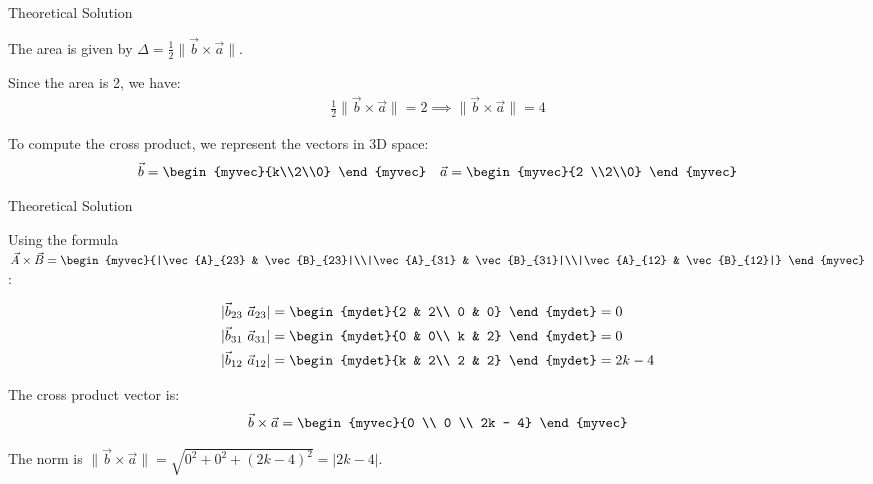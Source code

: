 \documentclass{beamer}
\numberwithin{equation}{section}
\theoremstyle{remark}
\providecommand{\norm}[1]{\lVert#1\rVert}
\begin{document}
	\begin{frame}{Theoretical Solution}
		
		The area is given by $\Delta = \frac{1}{2}\norm{\vec{b}\times\vec{a}}$.
		
		Since the area is 2, we have:
		\begin{align}
			\frac{1}{2}\norm{\vec{b}\times\vec{a}} = 2 \implies \norm{\vec{b}\times\vec{a}} = 4
		\end{align}
		
		To compute the cross product, we represent the vectors in 3D space:
		\begin{align}
			\vec{b} = \begin{myvec}{k\\2\\0} \end{myvec} && \vec{a} = \begin{myvec}{2 \\2\\0} \end{myvec}
		\end{align}
		
	\end{frame}
	
	\begin{frame}{Theoretical Solution}
		
		Using the formula $\vec{A}\times\vec{B} = \begin{myvec}{|\vec{A}_{23} & \vec{B}_{23}|\\|\vec{A}_{31} & \vec{B}_{31}|\\|\vec{A}_{12} & \vec{B}_{12}|} \end{myvec}$:
		
		\begin{align}
			|\vec{b}_{23} \text{ } \vec{a}_{23}| &= \begin{mydet}{2 & 2\\ 0 & 0} \end{mydet} = 0 \\
			|\vec{b}_{31} \text{ } \vec{a}_{31}| &= \begin{mydet}{0 & 0\\ k & 2} \end{mydet} = 0 \\
			|\vec{b}_{12} \text{ } \vec{a}_{12}| &= \begin{mydet}{k & 2\\ 2 & 2} \end{mydet} = 2k - 4
		\end{align}
		
		The cross product vector is:
		\begin{align}
			\vec{b}\times\vec{a} = \begin{myvec}{0 \\ 0 \\ 2k - 4} \end{myvec}
		\end{align}
		
		The norm is $\norm{\vec{b}\times\vec{a}} = \sqrt{0^2+0^2+(2k-4)^2} = |2k-4|$.
		
	\end{frame}
	
\end{document}

